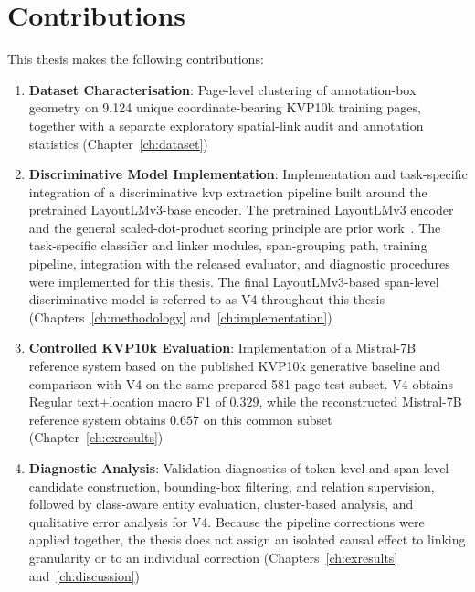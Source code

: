 \section{Contributions}
\label{sec:contributions}

This thesis makes the following contributions:

\begin{enumerate}
    \item \textbf{Dataset Characterisation}: Page-level clustering of annotation-box geometry on 9{,}124 unique coordinate-bearing KVP10k training pages, together with a separate exploratory spatial-link audit and annotation statistics (Chapter~\ref{ch:dataset})
    
    \item \textbf{Discriminative Model Implementation}: Implementation and
    task-specific integration of a discriminative \gls{kvp} extraction pipeline
    built around the pretrained LayoutLMv3-base encoder. The pretrained
    LayoutLMv3 encoder and the general scaled-dot-product scoring principle are
    prior work~\cite{layoutlmv3,vaswani2017attention}. The task-specific
    classifier and linker modules, span-grouping path, training pipeline,
    integration with the released evaluator, and diagnostic procedures were
    implemented for this thesis. The final LayoutLMv3-based span-level
    discriminative model is referred to as V4 throughout this thesis
    (Chapters~\ref{ch:methodology} and~\ref{ch:implementation})
    
    \item \textbf{Controlled KVP10k Evaluation}: Implementation of a Mistral-7B
    reference system based on the published KVP10k generative baseline and
    comparison with V4 on the same prepared 581-page test subset. V4 obtains
    Regular text+location macro F1 of $0.329$, while the reconstructed
    Mistral-7B reference system obtains $0.657$ on this common subset
    (Chapter~\ref{ch:exresults})
    
    \item \textbf{Diagnostic Analysis}: Validation diagnostics of token-level
    and span-level candidate construction, bounding-box filtering, and relation
    supervision, followed by class-aware entity evaluation, cluster-based
    analysis, and qualitative error analysis for V4. Because the pipeline
    corrections were applied together, the thesis does not assign an isolated
    causal effect to linking granularity or to an individual correction
    (Chapters~\ref{ch:exresults} and~\ref{ch:discussion})
\end{enumerate}

